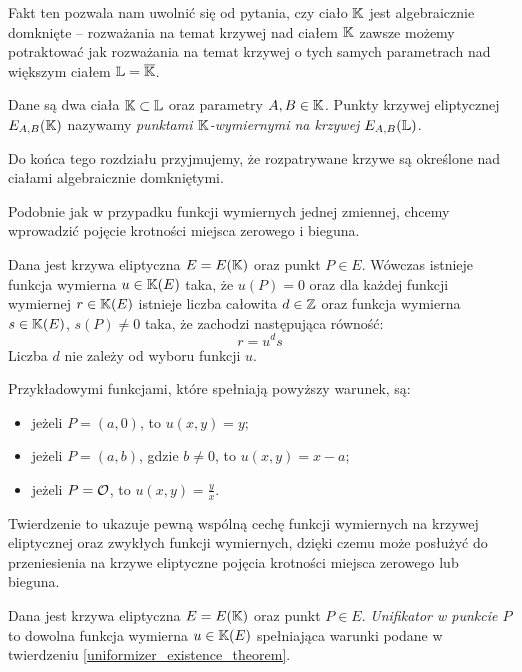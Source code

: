 Fakt ten pozwala nam uwolnić się od pytania,
czy ciało $\mathbb{K}$ jest algebraicznie domknięte --
rozważania na temat krzywej nad ciałem $\mathbb{K}$
zawsze możemy potraktować
jak rozważania na temat krzywej o tych samych parametrach
nad większym ciałem $\mathbb{L} = \overline{\mathbb{K}}$.

\begin{definition}
Dane są dwa ciała $\mathbb{K} \subset \mathbb{L}$ oraz parametry $A, B \in \mathbb{K}$.
Punkty krzywej eliptycznej $E_{A,B}(\mathbb{K})$
nazywamy \emph{punktami $\mathbb{K}$-wymiernymi na krzywej $E_{A,B}(\mathbb{L})$}.
\end{definition}

\begin{remark}
Do końca tego rozdziału przyjmujemy,
że rozpatrywane krzywe są określone nad ciałami algebraicznie domkniętymi.
\end{remark}

Podobnie jak w przypadku funkcji wymiernych jednej zmiennej,
chcemy wprowadzić pojęcie krotności miejsca zerowego i bieguna.

\begin{theorem}\label{uniformizer_existence_theorem}
Dana jest krzywa eliptyczna $E = E(\mathbb{K})$
oraz punkt $P \in E$.
Wówczas istnieje funkcja wymierna $u \in \mathbb{K}(E)$ taka, że $u(P) = 0$
oraz dla każdej funkcji wymiernej $r \in \mathbb{K}(E)$
istnieje liczba całowita $d \in \mathbb{Z}$
oraz funkcja wymierna $s \in \mathbb{K}(E)$, $s(P) \neq 0$ taka,
że zachodzi następująca równość:
\begin{equation}\label{uniformizer_decomposition_eqn}
r = u^ds
\end{equation}
Liczba $d$ nie zależy od wyboru funkcji $u$.

Przykładowymi funkcjami, które spełniają powyższy warunek, są:
\begin{itemize}
\item jeżeli $P = (a, 0)$, to $u(x, y) = y$;
\item jeżeli $P = (a, b)$, gdzie $b \neq 0$, to $u(x, y) = x - a$;
\item jeżeli $P = \mathcal{O}$, to $u(x, y) = \frac{y}{x}$.
\end{itemize}
\end{theorem}

Twierdzenie to ukazuje pewną wspólną cechę
funkcji wymiernych na krzywej eliptycznej
oraz zwykłych funkcji wymiernych,
dzięki czemu może posłużyć do przeniesienia na krzywe eliptyczne
pojęcia krotności miejsca zerowego lub bieguna.

\begin{definition}
Dana jest krzywa eliptyczna $E = E(\mathbb{K})$
oraz punkt $P \in E$.
\emph{Unifikator w punkcie $P$}
to dowolna funkcja wymierna $u \in \mathbb{K}(E)$
spełniająca warunki podane w twierdzeniu \ref{uniformizer_existence_theorem}.
\end{definition}

